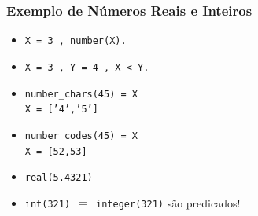 \begin{frame}
    \frametitle{Exemplo de Números Reais e Inteiros}
   
  \begin{itemize}
    \item  \texttt{X = 3 , number(X).}
    \item  \texttt{X = 3 , Y = 4 , X < Y.}
    \item \texttt{number\_chars(45) = X}\\ 
    \pause
    \texttt{X = ['4','5']}

    \item \texttt{number\_codes(45) = X}\\
    \pause
    \texttt{X = [52,53]}
    
    \item \texttt{real(5.4321)}
    
    \item \texttt{int(321) $\equiv$ integer(321)} são predicados!
    
  \end{itemize}
  
   
\end{frame}



